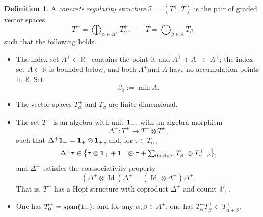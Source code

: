 \documentclass[JEP,XML,SOM,Unicode,published]{cedram}
\DeclareMathOperator{\Span}{span}
\theoremstyle{plain}
\theoremstyle{definition}
\newtheorem*{defn*} {Definition}
\DeclareMathOperator{\iden}{Id}
\newcommand{\bbR}{\mathbb{R}}
\begin{document}
\begin{defn*}
A \emph{{concrete regularity structure}} $\mathscr{T}=(T^+,T)$ is the pair of graded vector spaces\vspace*{-3pt}
\[
T^+ = \bigoplus_{\alpha\in A^+} T_\alpha^+, \qquad T = \bigoplus_{\beta\in A} T_\beta
\]
such that the following holds.
\begin{itemize}
\item The index set $A^{+}\subset \bbR_+$ contains the point $0$, and $A^++A^+ \subset A^+$; the index set $A\subset\bbR$ is bounded below, and both $A^+$and $A$ have no accumulation points in $\bbR$. Set\vspace*{-3pt}
\[
\beta_0 := \min A.
\]

\item The vector spaces $T_\alpha^+$ and $T_\beta$ are finite dimensional.

\item The set $T^+$ is an algebra with unit $\bf 1_+$, with an algebra morphism\vspace*{-3pt}
\[
\Delta^+ : T^+\to T^+\otimes T^+,
\]
such that $\Delta^+{\bf 1}_+ = {\bf 1}_+\otimes {\bf 1}_+$, and, for $\tau\in T_\alpha^+$,\vspace*{-3pt}
\begin{equation} \label{EqDefnDeltaPlus}
\Delta^+\tau \in \bigl\{\tau\otimes {\bf 1}_+ + {\bf 1}_+\otimes \tau + \textstyle\sum_{0<\beta<\alpha} T^+_\beta\otimes T^+_{\alpha-\beta}\bigr\},
\end{equation}
and $\Delta^+$ satisfies the coassociativity property\vspace*{-3pt}
\[
(\Delta^+\otimes\iden )\Delta^+ = (\iden \otimes\Delta^+)\Delta^+.
\]
That is, $T^+$ has a Hopf structure with coproduct $\Delta^+$ and counit ${\bf1}_+'$.

\item One has $T_0^+ = \Span({\bf 1}_+)$, and for any $\alpha,\beta\in A^+$, one has $T_\alpha^+ T_\beta^+ \subset T_{\alpha+\beta}^+$.


\end{itemize}
\end{defn*}
\end{document}
